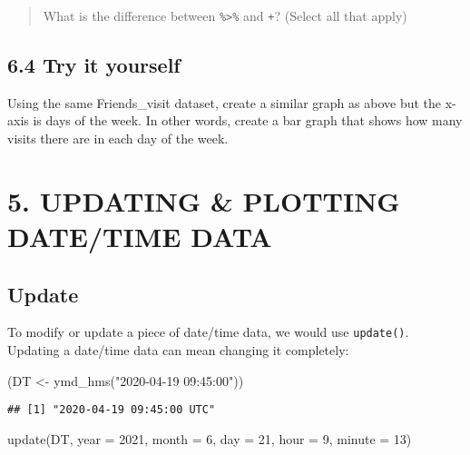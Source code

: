 \documentclass[
]{book}
\newenvironment{Shaded}{\begin{snugshade}}{\end{snugshade}}
\newcommand{\AttributeTok}[1]{\textcolor[rgb]{0.77,0.63,0.00}{#1}}
\newcommand{\DecValTok}[1]{\textcolor[rgb]{0.00,0.00,0.81}{#1}}
\newcommand{\FunctionTok}[1]{\textcolor[rgb]{0.00,0.00,0.00}{#1}}
\newcommand{\NormalTok}[1]{#1}
\newcommand{\OtherTok}[1]{\textcolor[rgb]{0.56,0.35,0.01}{#1}}
\newcommand{\StringTok}[1]{\textcolor[rgb]{0.31,0.60,0.02}{#1}}
\begin{document}
\begin{quote}
What is the difference between \texttt{\%\textgreater{}\%} and \texttt{+}? (Select all that apply)
\end{quote}

\hypertarget{try-it-yourself-31}{%
\subsection{6.4 Try it yourself}\label{try-it-yourself-31}}

Using the same Friends\_visit dataset, create a similar graph as above but the x-axis is days of the week. In other words, create a bar graph that shows how many visits there are in each day of the week.

\hypertarget{updating-plotting-datetime-data}{%
\section{5. UPDATING \& PLOTTING DATE/TIME DATA}\label{updating-plotting-datetime-data}}

\hypertarget{update}{%
\subsection{Update}\label{update}}

To modify or update a piece of date/time data, we would use \texttt{update()}. Updating a date/time data can mean changing it completely:

\begin{Shaded}
\begin{Highlighting}[]
\NormalTok{(DT }\OtherTok{\textless{}{-}} \FunctionTok{ymd\_hms}\NormalTok{(}\StringTok{"2020{-}04{-}19 09:45:00"}\NormalTok{))}
\end{Highlighting}
\end{Shaded}

\begin{verbatim}
## [1] "2020-04-19 09:45:00 UTC"
\end{verbatim}

\begin{Shaded}
\begin{Highlighting}[]
\FunctionTok{update}\NormalTok{(DT, }\AttributeTok{year =} \DecValTok{2021}\NormalTok{, }\AttributeTok{month =} \DecValTok{6}\NormalTok{, }\AttributeTok{day =} \DecValTok{21}\NormalTok{, }\AttributeTok{hour =} \DecValTok{9}\NormalTok{, }\AttributeTok{minute =} \DecValTok{13}\NormalTok{)}
\end{Highlighting}
\end{Shaded}
\end{document}

